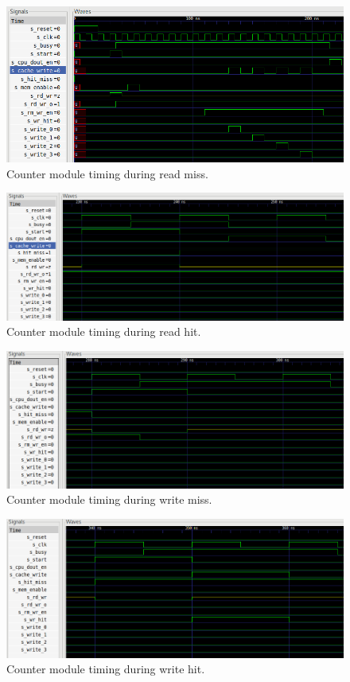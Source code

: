 \documentclass[10pt]{article}
\begin{document}
\begin{figure}[!htb]
    \centering
    \includegraphics[width=\textwidth]{crm.png}
    \caption{Counter module timing during read miss.}
    \label{crdmiss}
\end{figure}

\begin{figure}[!htb]
    \centering
    \includegraphics[width=\textwidth]{crh.png}
    \caption{Counter module timing during read hit.}
    \label{crdhit}
\end{figure}

\begin{figure}[!htb]
    \centering
    \includegraphics[width=\textwidth]{cwm.png}
    \caption{Counter module timing during write miss.}
    \label{cwrmiss}
\end{figure}

\begin{figure}[!htb]
    \centering
    \includegraphics[width=\textwidth]{cwh.png}
    \caption{Counter module timing during write hit.}
    \label{cwrhit}
\end{figure}
\end{document}
